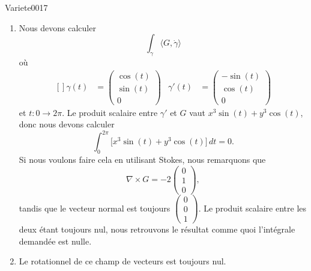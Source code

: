 \begin{corrige}{Variete0017}
\begin{enumerate}
		\item
			Nous devons calculer 
			\begin{equation}
				\int_{\gamma}\langle G, \dot\gamma\rangle 
			\end{equation}
			où
			\begin{equation}
				\begin{aligned}[]
					\gamma(t)&=\begin{pmatrix}
						\cos(t)	\\ 
						\sin(t)	\\ 
						0	
					\end{pmatrix}&\gamma'(t)&=\begin{pmatrix}
						-\sin(t)	\\ 
						\cos(t)	\\ 
						0	
					\end{pmatrix}
				\end{aligned}
			\end{equation}
			et $t\colon 0\to 2\pi$. Le produit scalaire entre $\gamma'$ et $G$ vaut $x^3\sin(t)+y^3\cos(t)$, donc nous devons calculer
			\begin{equation}
				\int_0^{2\pi} \big[ x^3\sin(t)+y^3\cos(t)\big]\,dt=0.
			\end{equation}
			Si nous voulons faire cela en utilisant Stokes, nous remarquons que
			\begin{equation}
				\nabla\times G=-2\begin{pmatrix}
					0	\\ 
					1	\\ 
					0	
				\end{pmatrix},
			\end{equation}
			tandis que le vecteur normal est toujours $\begin{pmatrix}
				0	\\ 
				0	\\ 
				1	
			\end{pmatrix}$. Le produit scalaire entre les deux étant toujours nul, nous retrouvons le résultat comme quoi l'intégrale demandée est nulle.

		\item
			Le rotationnel de ce champ de vecteurs est toujours nul.


\end{enumerate}
\end{corrige}
